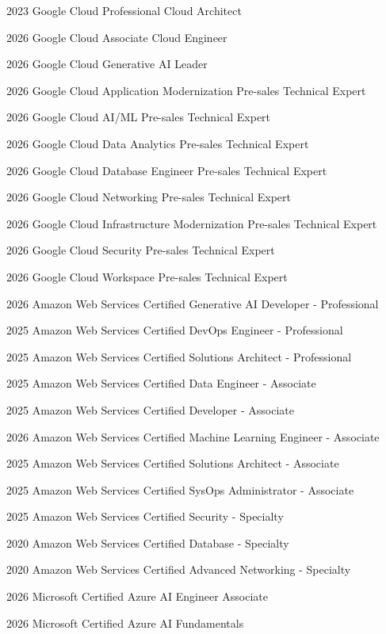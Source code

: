 \education
  {2023}
  {Google Cloud}
  {Professional Cloud Architect}

\education
  {2026}
  {Google Cloud}
  {Associate Cloud Engineer}

\education
  {2026}
  {Google Cloud}
  {Generative AI Leader}

\education
  {2026}
  {Google Cloud}
  {Application Modernization Pre-sales Technical Expert}

\education
  {2026}
  {Google Cloud}
  {AI/ML Pre-sales Technical Expert}

\education
  {2026}
  {Google Cloud}
  {Data Analytics Pre-sales Technical Expert}

\education
  {2026}
  {Google Cloud}
  {Database Engineer Pre-sales Technical Expert}

\education
  {2026}
  {Google Cloud}
  {Networking Pre-sales Technical Expert}

\education
  {2026}
  {Google Cloud}
  {Infrastructure Modernization Pre-sales Technical Expert}

\education
  {2026}
  {Google Cloud}
  {Security Pre-sales Technical Expert}

\education
  {2026}
  {Google Cloud}
  {Workspace Pre-sales Technical Expert}

\education
  {2026}
  {Amazon Web Services}
  {Certified Generative AI Developer - Professional}

\education
  {2025}
  {Amazon Web Services}
  {Certified DevOps Engineer - Professional}

\education
  {2025}
  {Amazon Web Services}
  {Certified Solutions Architect - Professional}

\education
  {2025}
  {Amazon Web Services}
  {Certified Data Engineer - Associate}

\education
  {2025}
  {Amazon Web Services}
  {Certified Developer - Associate}

\education
  {2026}
  {Amazon Web Services}
  {Certified Machine Learning Engineer - Associate}

\education
  {2025}
  {Amazon Web Services}
  {Certified Solutions Architect - Associate}

\education
  {2025}
  {Amazon Web Services}
  {Certified SysOps Administrator - Associate}

\education
  {2025}
  {Amazon Web Services}
  {Certified Security - Specialty}

\education
  {2020}
  {Amazon Web Services}
  {Certified Database - Specialty}

\education
  {2020}
  {Amazon Web Services}
  {Certified Advanced Networking - Specialty}

\education
  {2026}
  {Microsoft}
  {Certified Azure AI Engineer Associate}

\education
  {2026}
  {Microsoft}
  {Certified Azure AI Fundamentals}
